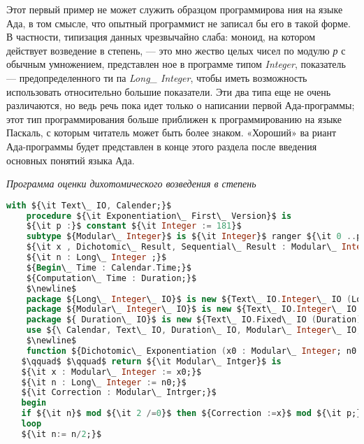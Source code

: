 \documentclass{mai_book}
\begin{document}
 Этот первый пример не может служить образцом программирова­
ния на языке Ада, в том смысле, что опытный программист не записал
бы его в такой форме. В частности, типизация данных чрезвычайно
слаба: моноид, на котором действует возведение в степень, — это мно­
жество целых чисел по модулю {\it р} с обычным умножением, представлен­
ное в программе типом {\it Integer}, показатель — предопределенного ти­
па {\it Long\_ Integer}, чтобы иметь возможность использовать относительно
большие показатели. Эти два типа еще не очень различаются, но ведь
речь пока идет только о написании первой Ада-программы; этот тип
программирования больше приближен к программированию на языке
Паскаль, с которым читатель может быть более знаком. «Хороший» ва­
риант Ада-программы будет представлен в конце этого раздела после
введения основных понятий языка Ада.
\begin{center}
\parbox{8cm}{
{\it {\small Программа оценки дихотомического возведения в степень}}}
\end{center}
\begin{lstlisting}[mathescape=true, language=Ada, basicstyle=\small]
    with ${\it Text\_ IO, Calender;}$
    procedure ${\it Exponentiation\_ First\_ Version}$ is
    ${\it p :}$ constant ${\it Integer := 181}$
    subtype ${Modular\_ Integer}$ is ${\it Integer}$ ranger ${\it 0 ..p-1}$ 
    ${\it x , Dichotomic\_ Result, Sequential\_ Result : Modular\_ Integer;}$
    ${\it n : Long\_ Integer ;}$
    ${Begin\_ Time : Calendar.Time;}$
    ${Computation\_ Time : Duration;}$
    $\newline$
    package ${Long\_ Integer\_ IO}$ is new ${Text\_ IO.Integer\_ IO (Long\_ Integer);}$
    package ${Modular\_ Integer\_ IO}$ is new ${Text\_ IO.Integer\_ IO (Modular\_ Integer);}$
    package ${ Duration\_ IO}$ is new ${Text\_ IO.Fixed\_ IO (Duration);}$
    use ${\ Calendar, Text\_ IO, Duration\_ IO, Modular\_ Integer\_ IO, Long\_ Integer\_ IO;}$
    $\newline$
    function ${Dichotomic\_ Exponentiation (x0 : Modular\_ Integer; n0 : Long\_ Integer)}$
   $\qquad$ $\qquad$ return ${\it Modular\_ Intger}$ is
   ${\it x : Modular\_ Integer := x0;}$
   ${\it n : Long\_ Integer := n0;}$
   ${\it Correction : Modular\_ Intrger;}$
   begin
   if ${\it n}$ mod ${\it 2 /=0}$ then ${Correction :=x}$ mod ${\it p;}$ else ${\it Correction := 1;}$ end if;
   loop
   ${\it n:= n/2;}$
 
   \end{lstlisting} 
\end{document}
